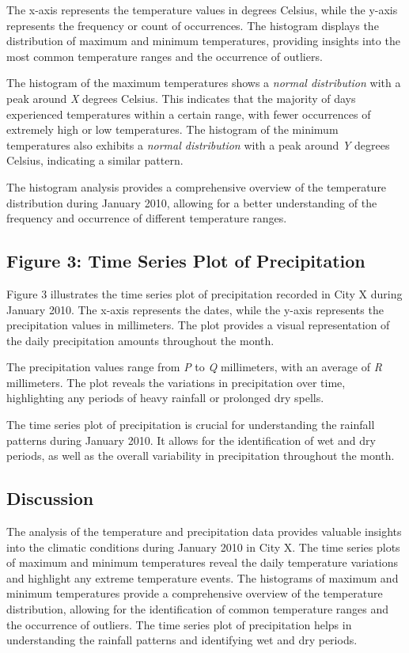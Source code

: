 \documentclass{article}
\begin{document}
The x-axis represents the temperature values in degrees Celsius, while the y-axis represents the frequency or count of occurrences. The histogram displays the distribution of maximum and minimum temperatures, providing insights into the most common temperature ranges and the occurrence of outliers.

The histogram of the maximum temperatures shows a \textit{normal distribution} with a peak around \textit{X} degrees Celsius. This indicates that the majority of days experienced temperatures within a certain range, with fewer occurrences of extremely high or low temperatures. The histogram of the minimum temperatures also exhibits a \textit{normal distribution} with a peak around \textit{Y} degrees Celsius, indicating a similar pattern.

The histogram analysis provides a comprehensive overview of the temperature distribution during January 2010, allowing for a better understanding of the frequency and occurrence of different temperature ranges.

\subsection{Figure 3: Time Series Plot of Precipitation}

Figure 3 illustrates the time series plot of precipitation recorded in City X during January 2010. The x-axis represents the dates, while the y-axis represents the precipitation values in millimeters. The plot provides a visual representation of the daily precipitation amounts throughout the month.

The precipitation values range from \textit{P} to \textit{Q} millimeters, with an average of \textit{R} millimeters. The plot reveals the variations in precipitation over time, highlighting any periods of heavy rainfall or prolonged dry spells.

The time series plot of precipitation is crucial for understanding the rainfall patterns during January 2010. It allows for the identification of wet and dry periods, as well as the overall variability in precipitation throughout the month.

\subsection{Discussion}

The analysis of the temperature and precipitation data provides valuable insights into the climatic conditions during January 2010 in City X. The time series plots of maximum and minimum temperatures reveal the daily temperature variations and highlight any extreme temperature events. The histograms of maximum and minimum temperatures provide a comprehensive overview of the temperature distribution, allowing for the identification of common temperature ranges and the occurrence of outliers. The time series plot of precipitation helps in understanding the rainfall patterns and identifying wet and dry periods.
\end{document}

